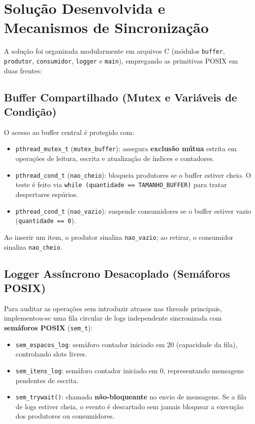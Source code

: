 \documentclass[11pt, a4paper]{article}
\begin{document}
\section{Solução Desenvolvida e Mecanismos de Sincronização}

A solução foi organizada modularmente em arquivos C (módulos \texttt{buffer}, \texttt{produtor}, \texttt{consumidor}, \texttt{logger} e \texttt{main}), empregando as primitivas POSIX em duas frentes:

\subsection{Buffer Compartilhado (Mutex e Variáveis de Condição)}
O acesso ao buffer central é protegido com:
\begin{itemize}\setlength{\itemsep}{0pt}\setlength{\parskip}{0pt}
    \item \texttt{pthread\_mutex\_t} (\texttt{mutex\_buffer}): assegura \textbf{exclusão mútua} estrita em operações de leitura, escrita e atualização de índices e contadores.
    \item \texttt{pthread\_cond\_t} (\texttt{nao\_cheio}): bloqueia produtores se o buffer estiver cheio. O teste é feito via \texttt{while (quantidade == TAMANHO\_BUFFER)} para tratar despertares espúrios.
    \item \texttt{pthread\_cond\_t} (\texttt{nao\_vazio}): suspende consumidores se o buffer estiver vazio (\texttt{quantidade == 0}).
\end{itemize}
Ao inserir um item, o produtor sinaliza \texttt{nao\_vazio}; ao retirar, o consumidor sinaliza \texttt{nao\_cheio}.

\subsection{Logger Assíncrono Desacoplado (Semáforos POSIX)}
Para auditar as operações sem introduzir atrasos nas threads principais, implementou-se uma fila circular de logs independente sincronizada com \textbf{semáforos POSIX} (\texttt{sem\_t}):
\begin{itemize}\setlength{\itemsep}{0pt}\setlength{\parskip}{0pt}
    \item \texttt{sem\_espacos\_log}: semáforo contador iniciado em $20$ (capacidade da fila), controlando slots livres.
    \item \texttt{sem\_itens\_log}: semáforo contador iniciado em $0$, representando mensagens pendentes de escrita.
    \item \texttt{sem\_trywait()}: chamada \textbf{não-bloqueante} no envio de mensagens. Se a fila de logs estiver cheia, o evento é descartado sem jamais bloquear a execução dos produtores ou consumidores.
\end{itemize}
\end{document}
